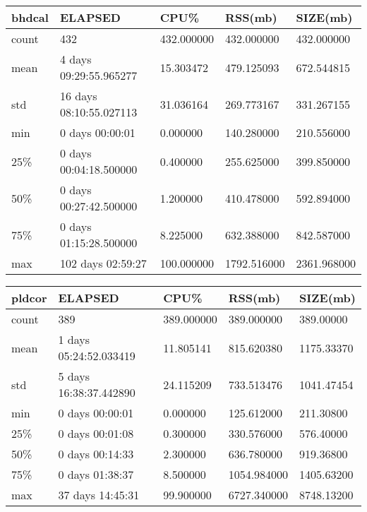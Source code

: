 \documentclass{article}
\begin{document}
\begin{table}[H]
\begin{tabular}{|l|l|l|l|l|}
\hline bhdcal& ELAPSED&    CPU\%&   RSS(mb)&  SIZE(mb) \\
\hline count&                      432&  432.000000 &  432.000000 &  432.000000 \\
\hline mean&    4 days 09:29:55.965277&   15.303472 &  479.125093 &  672.544815 \\
\hline std&    16 days 08:10:55.027113&   31.036164 &  269.773167 &  331.267155 \\
\hline min&            0 days 00:00:01&    0.000000 &  140.280000  & 210.556000 \\
\hline 25\%&     0 days 00:04:18.500000&    0.400000 &  255.625000 &  399.850000 \\
\hline 50\%&     0 days 00:27:42.500000&    1.200000 &  410.478000 &  592.894000 \\
\hline 75\%&     0 days 01:15:28.500000&    8.225000 &  632.388000 &  842.587000 \\
\hline max&          102 days 02:59:27&  100.000000 & 1792.516000&  2361.968000 \\
\hline 
\end{tabular}
\label{TABLE-SessionSizebhdcal}
\end{table}

\begin{table}[H]
\begin{tabular}{|l|l|l|l|l|}
\hline pldcor& ELAPSED&   CPU\%&  RSS(mb)&   SIZE(mb) \\
\hline count&    389& 389.000000&  389.000000&  389.00000 \\
\hline mean&  1 days 05:24:52.033419&  11.805141&  815.620380& 1175.33370 \\
\hline std&  5 days 16:38:37.442890&  24.115209&  733.513476& 1041.47454 \\
\hline min&   0 days 00:00:01&  0.000000&  125.612000&  211.30800 \\
\hline 25\%&   0 days 00:01:08&  0.300000&  330.576000&  576.40000 \\
\hline 50\%&   0 days 00:14:33&  2.300000&  636.780000&  919.36800 \\
\hline 75\%&   0 days 01:38:37&  8.500000& 1054.984000& 1405.63200 \\
\hline max&  37 days 14:45:31&  99.900000& 6727.340000& 8748.13200 \\
\hline 
\end{tabular}
\label{TABLE-SessionSizepldcor}
\end{table}
\end{document}
